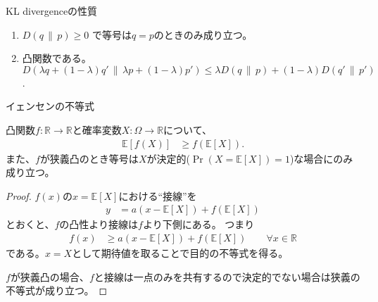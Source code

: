 \documentclass[lualatex,handout]{beamer}
\newcommand{\expt}[1]{\mathbb{E}\left[#1\right]}
\newcommand\KL[2]{D\left(#1\,\|\,#2\right)}
\theoremstyle{definition}
\begin{document}
\begin{frame}{KL divergenceの性質}
\begin{enumerate}
\setlength{\itemsep}{2em}
\item $\KL{q}{p}\ge 0$ で等号は$q=p$のときのみ成り立つ。
\item 凸関数である。
$\KL{\lambda q+(1-\lambda)q'}{\lambda p+(1-\lambda)p'}
\le
\lambda\KL{q}{p} + (1-\lambda)\KL{q'}{p'}$.
\end{enumerate}
\end{frame}

\begin{frame}{イェンセンの不等式}
\footnotesize
\begin{lemma}
凸関数$f\colon\mathbb{R}\to\mathbb{R}$と確率変数$X\colon\Omega\to\mathbb{R}$について、
\begin{align*}
\expt{f(X)} &\ge f(\expt{X}).
\end{align*}
また、$f$が狭義凸のとき等号は$X$が決定的($\Pr(X=\expt{X})=1$)な場合にのみ成り立つ。
\end{lemma}
\begin{proof}
$f(x)$の$x=\expt{X}$における``接線''を
\begin{align*}
y&=a(x-\expt{X}) + f(\expt{X})
\end{align*}
とおくと、$f$の凸性より接線は$f$より下側にある。
つまり
\begin{align*}
f(x) &\ge a(x-\expt{X}) + f(\expt{X})\qquad \forall x\in\mathbb{R}
\end{align*}
である。$x=X$として期待値を取ることで目的の不等式を得る。

$f$が狭義凸の場合、$f$と接線は一点のみを共有するので決定的でない場合は狭義の不等式が成り立つ。
\end{proof}
\end{frame}
\end{document}
